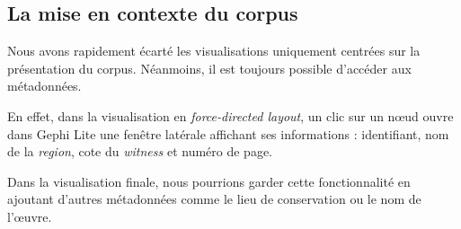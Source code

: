 \subsection{La mise en contexte du corpus}

Nous avons rapidement écarté les visualisations uniquement centrées sur la présentation du corpus. Néanmoins, il est toujours possible d'accéder aux métadonnées. 

En effet, dans la visualisation en \textit{force-directed layout}, un clic sur un nœud ouvre dans Gephi Lite une fenêtre latérale affichant ses informations : identifiant, nom de la \textit{region}, cote du \textit{witness} et numéro de page.

Dans la visualisation finale, nous pourrions garder cette fonctionnalité en ajoutant d'autres métadonnées comme le lieu de conservation ou le nom de l'œuvre.
